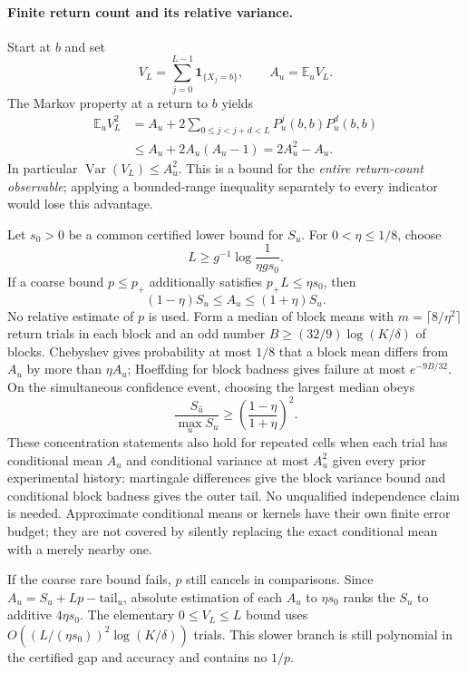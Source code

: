 \paragraph{Finite return count and its relative variance.}
Start at $b$ and set
\[
 V_L=\sum_{j=0}^{L-1}\mathbf1_{\{X_j=b\}},\qquad A_u=\mathbb E_u V_L.
\]
The Markov property at a return to $b$ yields
\begin{align*}
 \mathbb E_u V_L^2
 &=A_u+2\sum_{0\le j<j+d<L}P_u^j(b,b)P_u^d(b,b)\\
 &\le A_u+2A_u(A_u-1)=2A_u^2-A_u.
\end{align*}
In particular $\operatorname{Var}(V_L)\le A_u^2$.  This is a bound for
the \emph{entire return-count observable}; applying a bounded-range
inequality separately to every indicator would lose this advantage.

Let $s_0>0$ be a common certified lower bound for $S_u$.  For
$0<\eta\le1/8$, choose
\[
 L\ge g^{-1}\log\frac1{\eta g s_0}.
\]
If a coarse bound $p\le p_+$ additionally satisfies
$p_+L\le\eta s_0$, then
\[
 (1-\eta)S_u\le A_u\le(1+\eta)S_u.
\]
No relative estimate of $p$ is used.  Form a median of block means with
$m=\lceil8/\eta^2\rceil$ return trials in each block and an odd number
$B\ge(32/9)\log(K/\delta)$ of blocks.  Chebyshev gives probability at most
$1/8$ that a block mean differs from $A_u$ by more than $\eta A_u$;
Hoeffding for block badness gives failure at most $e^{-9B/32}$.
On the simultaneous confidence event, choosing the largest median obeys
\begin{equation}
 \frac{S_{\widehat u}}{\max_u S_u}
 \ge\left(\frac{1-\eta}{1+\eta}\right)^2.
 \label{eq:returnregret}
\end{equation}
These concentration statements also hold for repeated cells when each
trial has conditional mean $A_u$ and conditional variance at most $A_u^2$
given every prior experimental history: martingale differences give the
block variance bound and conditional block badness gives the outer tail.
No unqualified independence claim is needed.  Approximate conditional
means or kernels have their own finite error budget; they are not covered
by silently replacing the exact conditional mean with a merely nearby one.

If the coarse rare bound fails, $p$ still cancels in comparisons.  Since
$A_u=S_u+Lp-\text{tail}_u$, absolute estimation of each $A_u$ to
$\eta s_0$ ranks the $S_u$ to additive $4\eta s_0$.  The elementary
$0\le V_L\le L$ bound uses
$O((L/(\eta s_0))^2\log(K/\delta))$ trials.  This slower branch is still
polynomial in the certified gap and accuracy and contains no $1/p$.

